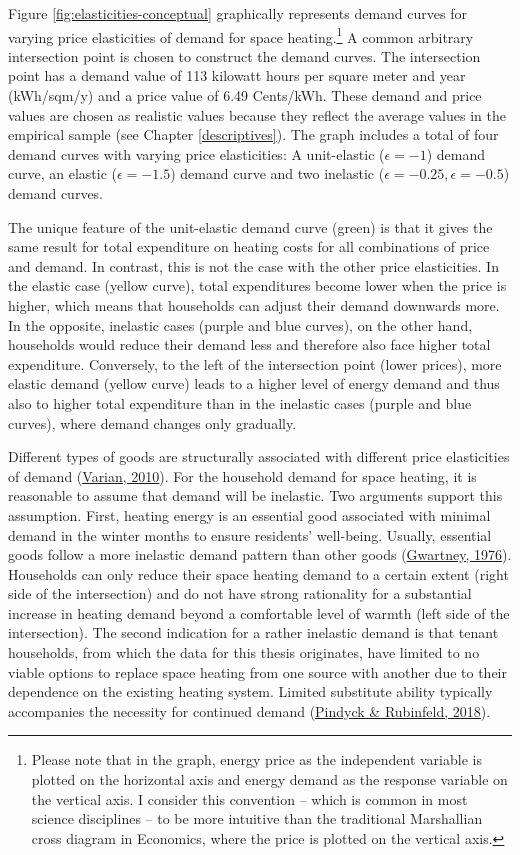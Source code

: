 \documentclass[12pt,twoside]{reedthesis}
\begin{document}
Figure \ref{fig:elasticities-conceptual} graphically represents demand curves for varying price elasticities of demand for space heating.\footnote{Please note that in the graph, energy price as the independent variable is plotted on the horizontal axis and energy demand as the response variable on the vertical axis. I consider this convention -- which is common in most science disciplines -- to be more intuitive than the traditional Marshallian cross diagram in Economics, where the price is plotted on the vertical axis.} A common arbitrary intersection point is chosen to construct the demand curves. The intersection point has a demand value of 113 kilowatt hours per square meter and year (kWh/sqm/y) and a price value of 6.49 Cents/kWh. These demand and price values are chosen as realistic values because they reflect the average values in the empirical sample (see Chapter \ref{descriptives}). The graph includes a total of four demand curves with varying price elasticities: A unit-elastic (\(\epsilon = -1\)) demand curve, an elastic (\(\epsilon = -1.5\)) demand curve and two inelastic (\(\epsilon = -0.25, \epsilon = -0.5\)) demand curves.

The unique feature of the unit-elastic demand curve (green) is that it gives the same result for total expenditure on heating costs for all combinations of price and demand. In contrast, this is not the case with the other price elasticities. In the elastic case (yellow curve), total expenditures become lower when the price is higher, which means that households can adjust their demand downwards more. In the opposite, inelastic cases (purple and blue curves), on the other hand, households would reduce their demand less and therefore also face higher total expenditure. Conversely, to the left of the intersection point (lower prices), more elastic demand (yellow curve) leads to a higher level of energy demand and thus also to higher total expenditure than in the inelastic cases (purple and blue curves), where demand changes only gradually.

Different types of goods are structurally associated with different price elasticities of demand (\protect\hyperlink{ref-varian10}{Varian, 2010}). For the household demand for space heating, it is reasonable to assume that demand will be inelastic. Two arguments support this assumption. First, heating energy is an essential good associated with minimal demand in the winter months to ensure residents' well-being. Usually, essential goods follow a more inelastic demand pattern than other goods (\protect\hyperlink{ref-gwartney76}{Gwartney, 1976}). Households can only reduce their space heating demand to a certain extent (right side of the intersection) and do not have strong rationality for a substantial increase in heating demand beyond a comfortable level of warmth (left side of the intersection). The second indication for a rather inelastic demand is that tenant households, from which the data for this thesis originates, have limited to no viable options to replace space heating from one source with another due to their dependence on the existing heating system. Limited substitute ability typically accompanies the necessity for continued demand (\protect\hyperlink{ref-pindyck_rubinfeld18}{Pindyck \& Rubinfeld, 2018}).
\end{document}
